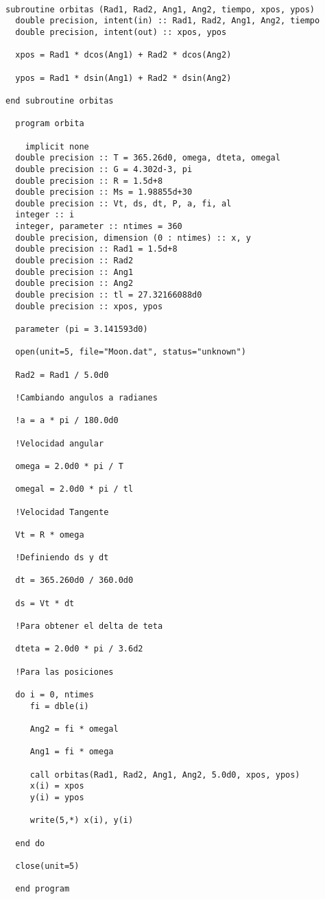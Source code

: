 \documentclass{article}
\begin{document}
\begin{verbatim}

subroutine orbitas (Rad1, Rad2, Ang1, Ang2, tiempo, xpos, ypos)
  double precision, intent(in) :: Rad1, Rad2, Ang1, Ang2, tiempo
  double precision, intent(out) :: xpos, ypos

  xpos = Rad1 * dcos(Ang1) + Rad2 * dcos(Ang2)

  ypos = Rad1 * dsin(Ang1) + Rad2 * dsin(Ang2)

end subroutine orbitas

  program orbita

    implicit none
  double precision :: T = 365.26d0, omega, dteta, omegal 
  double precision :: G = 4.302d-3, pi
  double precision :: R = 1.5d+8
  double precision :: Ms = 1.98855d+30
  double precision :: Vt, ds, dt, P, a, fi, al
  integer :: i
  integer, parameter :: ntimes = 360
  double precision, dimension (0 : ntimes) :: x, y
  double precision :: Rad1 = 1.5d+8
  double precision :: Rad2
  double precision :: Ang1
  double precision :: Ang2
  double precision :: tl = 27.32166088d0
  double precision :: xpos, ypos  
  
  parameter (pi = 3.141593d0)

  open(unit=5, file="Moon.dat", status="unknown")
  
  Rad2 = Rad1 / 5.0d0
  
  !Cambiando angulos a radianes
  
  !a = a * pi / 180.0d0

  !Velocidad angular

  omega = 2.0d0 * pi / T

  omegal = 2.0d0 * pi / tl

  !Velocidad Tangente

  Vt = R * omega

  !Definiendo ds y dt
  
  dt = 365.260d0 / 360.0d0

  ds = Vt * dt

  !Para obtener el delta de teta

  dteta = 2.0d0 * pi / 3.6d2 

  !Para las posiciones

  do i = 0, ntimes
     fi = dble(i)
     
     Ang2 = fi * omegal

     Ang1 = fi * omega

     call orbitas(Rad1, Rad2, Ang1, Ang2, 5.0d0, xpos, ypos)
     x(i) = xpos
     y(i) = ypos

     write(5,*) x(i), y(i)

  end do

  close(unit=5)
  
  end program

\end{verbatim}
\end{document}
